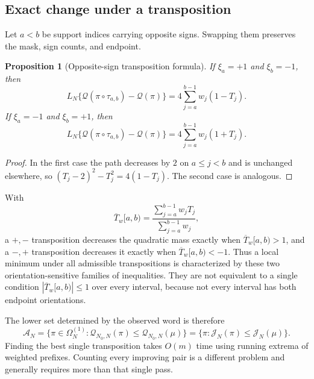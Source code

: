 \documentclass[11pt,reqno]{amsart}
\numberwithin{equation}{section}
\theoremstyle{plain}
\newtheorem{proposition}[theorem]{Proposition}
\theoremstyle{definition}
\theoremstyle{remark}
\newcommand{\Om}{\Omega}
\newcommand{\QF}{\mathcal Q}
\newcommand{\cA}{\mathcal A}
\begin{document}
\subsection{Exact change under a transposition}
\label{subsec:transposition-calculus}

Let \(a<b\) be support indices carrying opposite signs.  Swapping them
preserves the mask, sign counts, and endpoint.

\begin{proposition}[Opposite-sign transposition formula]
\label{prop:transposition-formula}
If \(\xi_a=+1\) and \(\xi_b=-1\), then
\begin{equation}
L_N\{\QF(\pi\circ\tau_{a,b})-\QF(\pi)\}
=4\sum_{j=a}^{b-1}w_j(1-T_j).
\label{eq:plus-minus-transposition}
\end{equation}
If \(\xi_a=-1\) and \(\xi_b=+1\), then
\begin{equation}
L_N\{\QF(\pi\circ\tau_{a,b})-\QF(\pi)\}
=4\sum_{j=a}^{b-1}w_j(1+T_j).
\label{eq:minus-plus-transposition}
\end{equation}
\end{proposition}

\begin{proof}
In the first case the path decreases by \(2\) on \(a\leq j<b\) and is
unchanged elsewhere, so
\((T_j-2)^2-T_j^2=4(1-T_j)\).  The second case is analogous.
\end{proof}

With
\begin{equation}
\overline T_w[a,b)
=\frac{\sum_{j=a}^{b-1}w_jT_j}
{\sum_{j=a}^{b-1}w_j},
\label{eq:weighted-interval-mean}
\end{equation}
a \(+,-\) transposition decreases the quadratic mass exactly when
\(\overline T_w[a,b)>1\), and a \(-,+\) transposition decreases it exactly
when \(\overline T_w[a,b)<-1\).  Thus a local minimum under all admissible
transpositions is characterized by these two orientation-sensitive families
of inequalities.  They are not equivalent to a single condition
\(|\overline T_w[a,b)|\leq1\) over every interval, because not every interval
has both endpoint orientations.

The lower set determined by the observed word is therefore
\begin{equation}
\cA_N
=\{\pi\in\Om_N^{(1)}:\QF_{N_0,N}(\pi)
\leq\QF_{N_0,N}(\mu)\}
=\{\pi:\mathcal J_N(\pi)\leq\mathcal J_N(\mu)\}.
\label{eq:lower-mass-set}
\end{equation}
Finding the best single transposition takes \(O(m)\) time using running
extrema of weighted prefixes.  Counting every improving pair is a different
problem and generally requires more than that single pass.
\end{document}
